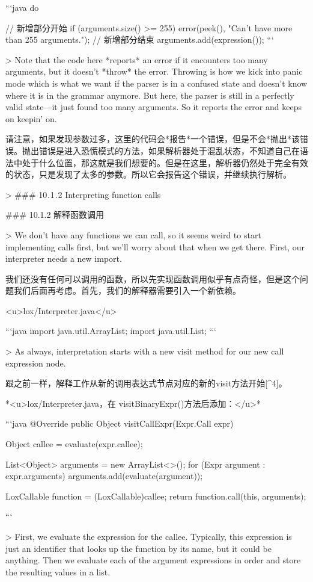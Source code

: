 \documentclass[cn,11pt,chinese]{elegantbook}
\begin{document}
```java
      do {
        // 新增部分开始
        if (arguments.size() >= 255) {
          error(peek(), "Can't have more than 255 arguments.");
        }
        // 新增部分结束
        arguments.add(expression());
```

> Note that the code here *reports* an error if it encounters too many arguments, but it doesn’t *throw* the error. Throwing is how we kick into panic mode which is what we want if the parser is in a confused state and doesn’t know where it is in the grammar anymore. But here, the parser is still in a perfectly valid state—it just found too many arguments. So it reports the error and keeps on keepin’ on.

请注意，如果发现参数过多，这里的代码会*报告*一个错误，但是不会*抛出*该错误。抛出错误是进入恐慌模式的方法，如果解析器处于混乱状态，不知道自己在语法中处于什么位置，那这就是我们想要的。但是在这里，解析器仍然处于完全有效的状态，只是发现了太多的参数。所以它会报告这个错误，并继续执行解析。

> ### 10 . 1 . 2 Interpreting function calls

### 10.1.2 解释函数调用

> We don’t have any functions we can call, so it seems weird to start implementing calls first, but we’ll worry about that when we get there. First, our interpreter needs a new import.

我们还没有任何可以调用的函数，所以先实现函数调用似乎有点奇怪，但是这个问题我们后面再考虑。首先，我们的解释器需要引入一个新依赖。

<u>lox/Interpreter.java</u>

```java
import java.util.ArrayList;
import java.util.List;
```

> As always, interpretation starts with a new visit method for our new call expression node.

跟之前一样，解释工作从新的调用表达式节点对应的新的visit方法开始[^4]。

*<u>lox/Interpreter.java，在 visitBinaryExpr()方法后添加：</u>*

```java
  @Override
  public Object visitCallExpr(Expr.Call expr) {
    Object callee = evaluate(expr.callee);

    List<Object> arguments = new ArrayList<>();
    for (Expr argument : expr.arguments) { 
      arguments.add(evaluate(argument));
    }

    LoxCallable function = (LoxCallable)callee;
    return function.call(this, arguments);
  }
```

> First, we evaluate the expression for the callee. Typically, this expression is just an identifier that looks up the function by its name, but it could be anything. Then we evaluate each of the argument expressions in order and store the resulting values in a list.

}
\end{document}

